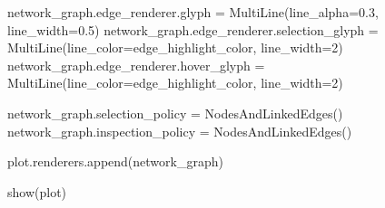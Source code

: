 \begin{codigo}[caption={Exemplo de classe Python para realizar o plot de grafo de redes sociais utilizando o Bokeh}, label={codigo:networkplotter}, language=Python, breaklines=true]
        network_graph.edge_renderer.glyph = MultiLine(line_alpha=0.3, line_width=0.5)
        network_graph.edge_renderer.selection_glyph = MultiLine(line_color=edge_highlight_color, line_width=2)
        network_graph.edge_renderer.hover_glyph = MultiLine(line_color=edge_highlight_color, line_width=2)

        network_graph.selection_policy = NodesAndLinkedEdges()
        network_graph.inspection_policy = NodesAndLinkedEdges()

        plot.renderers.append(network_graph)

        show(plot)
\end{codigo}